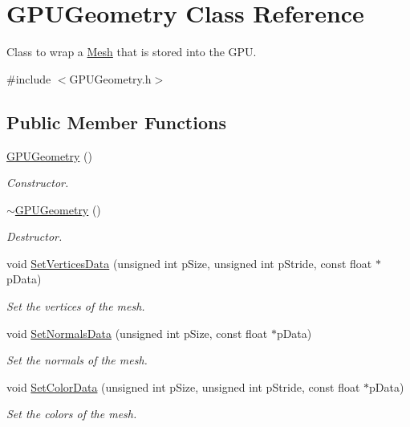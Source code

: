 \hypertarget{class_g_p_u_geometry}{\section{G\+P\+U\+Geometry Class Reference}
\label{class_g_p_u_geometry}
}


Class to wrap a \hyperlink{class_mesh}{Mesh} that is stored into the G\+P\+U.  




{\ttfamily \#include $<$G\+P\+U\+Geometry.\+h$>$}

\subsection*{Public Member Functions}
\begin{DoxyCompactItemize}
\item 
\hyperlink{class_g_p_u_geometry_aa4d74b9f6fd8775869ef55e9a12c58e1}{G\+P\+U\+Geometry} ()
\begin{DoxyCompactList}\small\item\em Constructor. \end{DoxyCompactList}\item 
\hyperlink{class_g_p_u_geometry_a2c669cbc3b1d05dd2f01785c3a82dac0}{$\sim$\+G\+P\+U\+Geometry} ()
\begin{DoxyCompactList}\small\item\em Destructor. \end{DoxyCompactList}\item 
void \hyperlink{class_g_p_u_geometry_ad369af1cb7037c00c7bfc0dd90f20d58}{Set\+Vertices\+Data} (unsigned int p\+Size, unsigned int p\+Stride, const float $\ast$p\+Data)
\begin{DoxyCompactList}\small\item\em Set the vertices of the mesh. \end{DoxyCompactList}\item 
void \hyperlink{class_g_p_u_geometry_a4d8cc365cfb6645e4a22eda3c7c00e6f}{Set\+Normals\+Data} (unsigned int p\+Size, const float $\ast$p\+Data)
\begin{DoxyCompactList}\small\item\em Set the normals of the mesh. \end{DoxyCompactList}\item 
void \hyperlink{class_g_p_u_geometry_a735d8c8ce4d5bdeb792c973a26a2b874}{Set\+Color\+Data} (unsigned int p\+Size, unsigned int p\+Stride, const float $\ast$p\+Data)
\begin{DoxyCompactList}\small\item\em Set the colors of the mesh. \end{DoxyCompactList}\item 

\end{DoxyCompactItemize}
